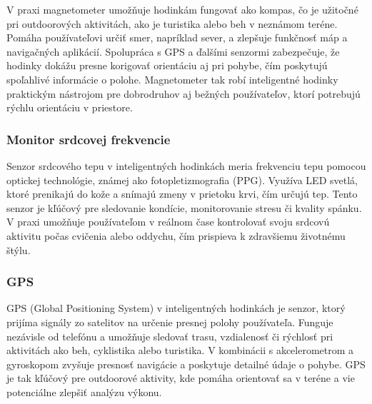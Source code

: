 V praxi magnetometer umožňuje hodinkám fungovať ako kompas, čo je užitočné pri outdoorových aktivitách, ako je turistika alebo beh v neznámom teréne. Pomáha používateľovi určiť smer, napríklad sever, a zlepšuje funkčnosť máp a navigačných aplikácií. Spolupráca s GPS a ďalšími senzormi zabezpečuje, že hodinky dokážu presne korigovať orientáciu aj pri pohybe, čím poskytujú spoľahlivé informácie o polohe. Magnetometer tak robí inteligentné hodinky praktickým nástrojom pre dobrodruhov aj bežných používateľov, ktorí potrebujú rýchlu orientáciu v priestore. \cite{sensors-article}

\subsubsection{Monitor srdcovej frekvencie}
Senzor srdcového tepu v inteligentných hodinkách meria frekvenciu tepu pomocou optickej technológie, známej ako fotopletizmografia (PPG). Využíva LED svetlá, ktoré prenikajú do kože a snímajú zmeny v prietoku krvi, čím určujú tep. Tento senzor je kľúčový pre sledovanie kondície, monitorovanie stresu či kvality spánku. V praxi umožňuje používateľom v reálnom čase kontrolovať svoju srdcovú aktivitu počas cvičenia alebo oddychu, čím prispieva k zdravšiemu životnému štýlu. \cite{sensors-article}

\subsubsection{GPS}
GPS (Global Positioning System) v inteligentných hodinkách je senzor, ktorý prijíma signály zo satelitov na určenie presnej polohy používateľa. Funguje nezávisle od telefónu a umožňuje sledovať trasu, vzdialenosť či rýchlosť pri aktivitách ako beh, cyklistika alebo turistika. V kombinácii s akcelerometrom a gyroskopom zvyšuje presnosť navigácie a poskytuje detailné údaje o pohybe. GPS je tak kľúčový pre outdoorové aktivity, kde pomáha orientovať sa v teréne a vie potenciálne zlepšiť analýzu výkonu. \cite{sensors-article}